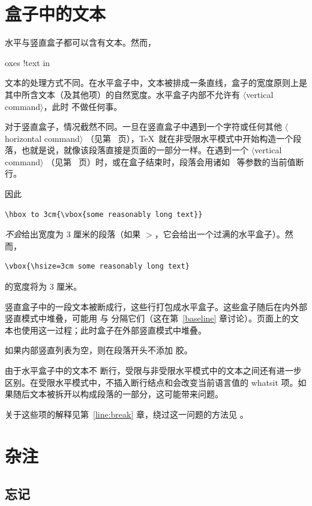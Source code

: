 \documentclass[a4paper]{rapport3}
\def\gr#1{$\langle$#1$\rangle$}\def\key#1{{\tt#1}}
\def\gram#1{\gr{#1}}%
\def\term#1\par{\index{#1}}
\begin{document}
\section{盒子中的文本}

水平与竖直盒子都可以含有文本。然而，
\term boxes !text in\par
文本的处理方式不同。在水平盒子中，文本被排成一条直线，盒子的宽度原则上是其中所含文本（及其他项）的自然宽度。水平盒子内部不允许有 \gram{vertical command}，此时  不做任何事。

对于竖直盒子，情况截然不同。一旦在竖直盒子中遇到一个字符或任何其他 \gram{horizontal command}
（见第~\pageref{h:com:list} 页），\TeX\ 就在非受限水平模式中开始构造一个段落，也就是说，就像该段落直接是页面的一部分一样。在遇到一个 \gram{vertical command}
（见第~\pageref{v:com:list} 页）时，或在盒子结束时，段落会用诸如~ 等参数的当前值断行。

因此
\begin{verbatim}
\hbox to 3cm{\vbox{some reasonably long text}}
\end{verbatim}
{\sl 不会\/}给出宽度为 3 厘米的段落（如果 ${}>{}$\n{3cm}，它会给出一个过满的水平盒子）。然而，
\begin{verbatim}
\vbox{\hsize=3cm some reasonably long text}
\end{verbatim}
的宽度将为 3 厘米。

竖直盒子中的一段文本被断成行，这些行打包成水平盒子。这些盒子随后在内外部竖直模式中堆叠，可能用  与  分隔它们（这在第~\ref{baseline} 章讨论）。页面上的文本也使用这一过程；此时盒子在外部竖直模式中堆叠。

如果内部竖直列表为空，则在段落开头不添加  胶。

由于水平盒子中的文本不
\label{wide:vbox}%
断行，受限与非受限水平模式中的文本之间还有进一步区别。在受限水平模式中，不插入断行结点和会改变当前语言值的 whatsit 项。如果随后文本被拆开以构成段落的一部分，这可能带来问题。

关于这些项的解释见第~\ref{line:break} 章，绕过这一问题的方法见 \cite{Downs}。

\section{杂注}

\subsection{忘记 }
\end{document}
